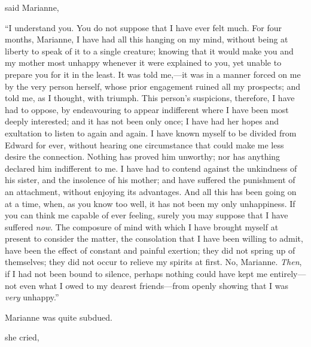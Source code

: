 said Marianne, 

“I understand you. You do not suppose that I have ever felt much. For four months, Marianne, I have had all this hanging on my mind, without being at liberty to speak of it to a single creature; knowing that it would make you and my mother most unhappy whenever it were explained to you, yet unable to prepare you for it in the least. It was told me,---it was in a manner forced on me by the very person herself, whose prior engagement ruined all my prospects; and told me, as I thought, with triumph. This person's suspicions, therefore, I have had to oppose, by endeavouring to appear indifferent where I have been most deeply interested; and it has not been only once; I have had her hopes and exultation to listen to again and again. I have known myself to be divided from Edward for ever, without hearing one circumstance that could make me less desire the connection. Nothing has proved him unworthy; nor has anything declared him indifferent to me. I have had to contend against the unkindness of his sister, and the insolence of his mother; and have suffered the punishment of an attachment, without enjoying its advantages. And all this has been going on at a time, when, as you know too well, it has not been my only unhappiness. If you can think me capable of ever feeling, surely you may suppose that I have suffered {\em now}. The composure of mind with which I have brought myself at present to consider the matter, the consolation that I have been willing to admit, have been the effect of constant and painful exertion; they did not spring up of themselves; they did not occur to relieve my spirits at first. No, Marianne. {\em Then}, if I had not been bound to silence, perhaps nothing could have kept me entirely---not even what I owed to my dearest friends---from openly showing that I was {\em very} unhappy.”

Marianne was quite subdued.

 she cried, 

